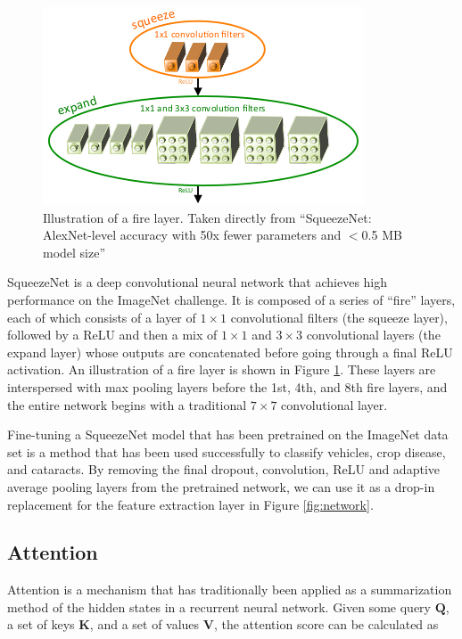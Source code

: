 \documentclass[10pt,twocolumn,letterpaper]{article}
\begin{document}
\begin{figure}
\begin{center}
\includegraphics[width=0.6\linewidth]{../images/fire/fire.png}
\end{center}
   \caption{Illustration of a fire layer. Taken directly from ``SqueezeNet: AlexNet-level accuracy with 50x fewer parameters and $<$0.5 MB model size''\cite{iandola2016squeezenet}}
\label{fig:fire}
\end{figure}

SqueezeNet is a deep convolutional neural network that achieves high performance on the ImageNet challenge. It is composed of a series of ``fire'' layers, each of which consists of a layer of $1 \times 1$ convolutional filters (the squeeze layer), followed by a ReLU and then a mix of $1 \times 1$ and $3 \times 3$ convolutional layers (the expand layer) whose outputs are concatenated before going through a final ReLU activation. An illustration of a fire layer is shown in Figure \ref{fig:fire}. These layers are interspersed with max pooling layers before the 1st, 4th, and 8th fire layers, and the entire network begins with a traditional $7 \times 7$ convolutional layer.

Fine-tuning a SqueezeNet model that has been pretrained on the ImageNet data set is a method that has been used successfully to classify vehicles\cite{agoes2017fine}, crop disease\cite{durmucs2017disease}, and cataracts\cite{qian2018machine}. By removing the final dropout, convolution, ReLU and adaptive average pooling layers from the pretrained network, we can use it as a drop-in replacement for the feature extraction layer in Figure \ref{fig:network}.

\subsection{Attention}
Attention is a mechanism that has traditionally been applied as a summarization method of the hidden states in a recurrent neural network. Given some query $\textbf{Q}$, a set of keys $\textbf{K}$, and a set of values $\textbf{V}$, the attention score can be calculated as
\end{document}
